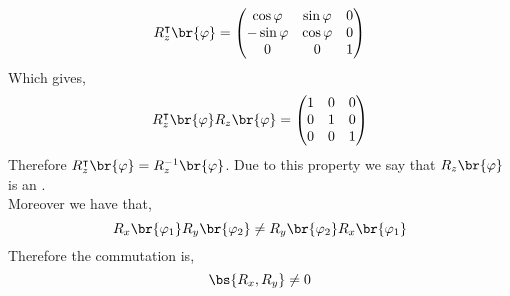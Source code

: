 \documentclass{article}
\begin{document}
\[ R_{z}^{\intercal}\br{\varphi} = \begin{pmatrix}
    \cos \varphi & \sin \varphi & 0 \\
    -\sin \varphi & \cos \varphi & 0 \\
    0 & 0 & 1 \\
\end{pmatrix} \]
Which gives,
\[ R_{z}^{\intercal}\br{\varphi}R_{z}\br{\varphi} = \begin{pmatrix}
    1 & 0 & 0 \\
    0 & 1 & 0 \\
    0 & 0 & 1 \\
\end{pmatrix} \]
Therefore $R_{z}^{\intercal}\br{\varphi} = R_{z}^{-1}\br{\varphi}$. Due to this property we say that $R_{z}\br{\varphi}$ is an . \\

Moreover we have that,
\[ R_{x}\br{\varphi_1}R_{y}\br{\varphi_2}\neq R_{y}\br{\varphi_2}R_{x}\br{\varphi_1} \]
Therefore the commutation is,
\[ \bs{R_{x},R_{y}} \neq 0 \]
\end{document}
